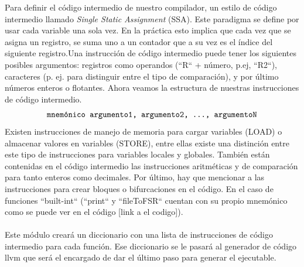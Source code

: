 Para definir el código intermedio de nuestro compilador, un estilo de código intermedio llamado \textit{Single Static Assignment} (SSA). Este paradigma se define por usar cada variable una sola vez. En la práctica esto implica que cada vez que se asigna un registro, se suma uno a un contador que a su vez es el índice del siguiente registro.Una instrucción de código intermedio puede tener los siguientes posibles argumentos: registros como operandos (``R`` + número, p.ej, ``R2``), caracteres (p. ej. para distinguir entre el tipo de comparación), y por último números enteros o flotantes. Ahora veamos la estructura de nuestras instrucciones de código intermedio.
\[ 
\texttt{ mnemónico argumento1, argumento2, \dots, argumentoN } 
\]
Existen instrucciones de manejo de memoria para cargar variables (LOAD) o almacenar valores en variables (\textsc{STORE}), entre ellas existe una distinción entre este tipo de instrucciones para variables locales y globales. También están contenidas en el código intermedio las instrucciones aritméticas y de comparación para tanto enteros como decimales. Por último, hay que mencionar a las instrucciones para crear bloques o bifurcaciones en el código. En el caso de funciones ``built-int`` (``print`` y ``fileToFSR`` cuentan con su propio mnemónico como se puede ver en el código [link a el codigo]).\\\\
Este módulo creará un diccionario con una lista de instrucciones de código intermedio para cada función. Ese diccionario se le pasará al generador de código llvm que será el encargado de dar el último paso para generar el ejecutable. 
